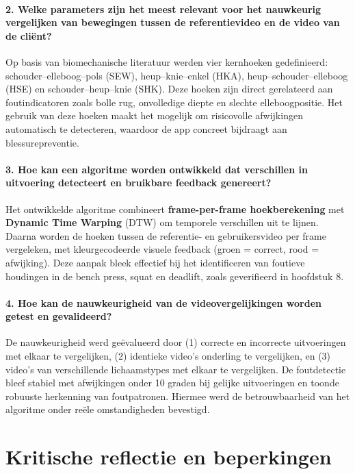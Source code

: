 \paragraph{2. Welke parameters zijn het meest relevant voor het nauwkeurig vergelijken van bewegingen tussen de referentievideo en de video van de cliënt?}
Op basis van biomechanische literatuur werden vier kernhoeken gedefinieerd: schouder--elleboog--pols (SEW), heup--knie--enkel (HKA), heup--schouder--elleboog (HSE) en schouder--heup--knie (SHK). Deze hoeken zijn direct gerelateerd aan foutindicatoren zoals bolle rug, onvolledige diepte en slechte elleboogpositie. Het gebruik van deze hoeken maakt het mogelijk om risicovolle afwijkingen automatisch te detecteren, waardoor de app concreet bijdraagt aan blessurepreventie.

\paragraph{3. Hoe kan een algoritme worden ontwikkeld dat verschillen in uitvoering detecteert en bruikbare feedback genereert?}
Het ontwikkelde algoritme combineert \textbf{frame-per-frame hoekberekening} met \textbf{Dynamic Time Warping} (DTW) om temporele verschillen uit te lijnen. Daarna worden de hoeken tussen de referentie- en gebruikersvideo per frame vergeleken, met kleurgecodeerde visuele feedback (groen = correct, rood = afwijking). Deze aanpak bleek effectief bij het identificeren van foutieve houdingen in de bench press, squat en deadlift, zoals geverifieerd in hoofdstuk 8.

\paragraph{4. Hoe kan de nauwkeurigheid van de videovergelijkingen worden getest en gevalideerd?}
De nauwkeurigheid werd geëvalueerd door (1) correcte en incorrecte uitvoeringen met elkaar te vergelijken, (2) identieke video's onderling te vergelijken, en (3) video’s van verschillende lichaamstypes met elkaar te vergelijken. De foutdetectie bleef stabiel met afwijkingen onder 10 graden bij gelijke uitvoeringen en toonde robuuste herkenning van foutpatronen. Hiermee werd de betrouwbaarheid van het algoritme onder reële omstandigheden bevestigd.

\section{Kritische reflectie en beperkingen}

